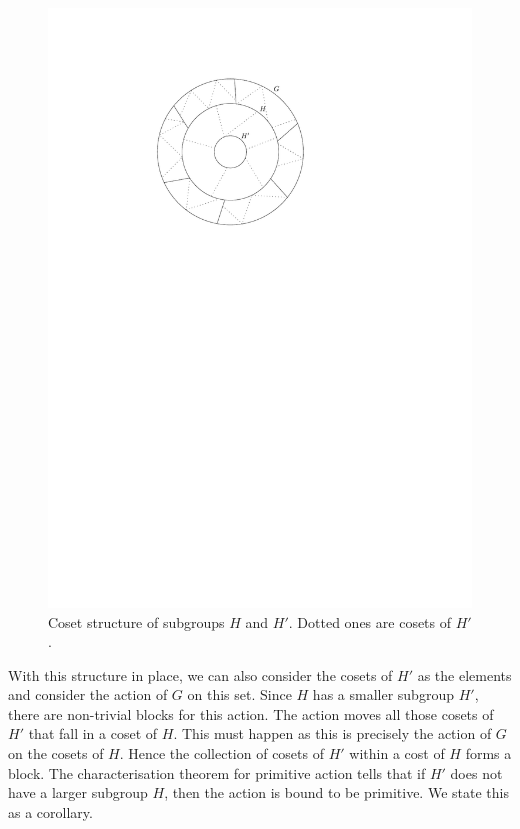 \begin{figure}[htp!]
	\centering
	\includegraphics[scale=0.7]{images/coset}
	\caption{Coset structure of subgroups $H$ and $H'$. Dotted ones are
	cosets of $H'$.}
	\label{fig:coset}
\end{figure}

With this structure in place, we can also consider the cosets of $H'$ 
as the elements and consider the action of $G$ on this set. Since $H$ has a
smaller subgroup $H'$, there are non-trivial blocks for this action. The
action moves all those cosets of $H'$ that fall in a coset of $H$. This must
happen as this is precisely the action of $G$ on the cosets of $H$.
Hence the collection of cosets of $H'$ within a cost of $H$ forms a block.
The characterisation theorem for primitive action tells that if $H'$ does not
have a larger subgroup $H$, then the action is bound to be primitive. We state
this as a corollary.


